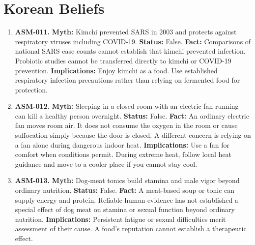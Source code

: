 \documentclass[11pt,oneside]{book}
\begin{document}
\section{Korean Beliefs}
\begin{enumerate}[leftmargin=0pt,labelwidth=0pt,labelsep=0pt,itemindent=0pt]
\item[] \textbf{ASM-011.} \textbf{Myth:} Kimchi prevented SARS in 2003 and protects against respiratory viruses including COVID-19.\newline
\textbf{Status:} False.\newline
\textbf{Fact:} Comparisons of national SARS case counts cannot establish that kimchi prevented infection. Probiotic studies cannot be transferred directly to kimchi or COVID-19 prevention. \cite{ref145,ref482}\newline
\textbf{Implications:} Enjoy kimchi as a food. Use established respiratory infection precautions rather than relying on fermented food for protection.
\item[] \textbf{ASM-012.} \textbf{Myth:} Sleeping in a closed room with an electric fan running can kill a healthy person overnight.\newline
\textbf{Status:} False.\newline
\textbf{Fact:} An ordinary electric fan moves room air. It does not consume the oxygen in the room or cause suffocation simply because the door is closed. A different concern is relying on a fan alone during dangerous indoor heat. \cite{ref483}\newline
\textbf{Implications:} Use a fan for comfort when conditions permit. During extreme heat, follow local heat guidance and move to a cooler place if you cannot stay cool.
\item[] \textbf{ASM-013.} \textbf{Myth:} Dog-meat tonics build stamina and male vigor beyond ordinary nutrition.\newline
\textbf{Status:} False.\newline
\textbf{Fact:} A meat-based soup or tonic can supply energy and protein. Reliable human evidence has not established a special effect of dog meat on stamina or sexual function beyond ordinary nutrition. \cite{ref209,ref480}\newline
\textbf{Implications:} Persistent fatigue or sexual difficulties merit assessment of their cause. A food's reputation cannot establish a therapeutic effect.
\end{enumerate}
\end{document}
